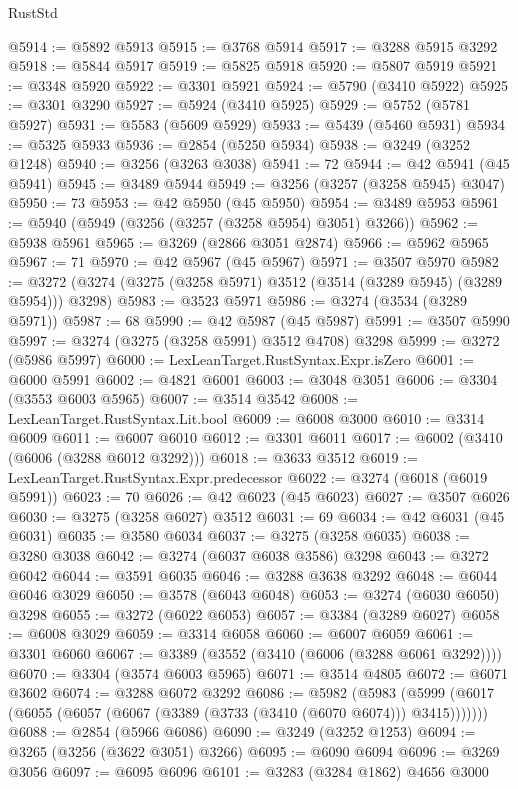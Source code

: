 \begin{lexlean}{RustStd}
\begin{coremodule}
@5914 := @5892 @5913
@5915 := @3768 @5914
@5917 := @3288 @5915 @3292
@5918 := @5844 @5917
@5919 := @5825 @5918
@5920 := @5807 @5919
@5921 := @3348 @5920
@5922 := @3301 @5921
@5924 := @5790 (@3410 @5922)
@5925 := @3301 @3290
@5927 := @5924 (@3410 @5925)
@5929 := @5752 (@5781 @5927)
@5931 := @5583 (@5609 @5929)
@5933 := @5439 (@5460 @5931)
@5934 := @5325 @5933
@5936 := @2854 (@5250 @5934)
@5938 := @3249 (@3252 @1248)
@5940 := @3256 (@3263 @3038)
@5941 := 72
@5944 := @42 @5941 (@45 @5941)
@5945 := @3489 @5944
@5949 := @3256 (@3257 (@3258 @5945) @3047)
@5950 := 73
@5953 := @42 @5950 (@45 @5950)
@5954 := @3489 @5953
@5961 := @5940 (@5949 (@3256 (@3257 (@3258 @5954) @3051) @3266))
@5962 := @5938 @5961
@5965 := @3269 (@2866 @3051 @2874)
@5966 := @5962 @5965
@5967 := 71
@5970 := @42 @5967 (@45 @5967)
@5971 := @3507 @5970
@5982 := @3272 (@3274 (@3275 (@3258 @5971) @3512 (@3514 (@3289 @5945) (@3289 @5954))) @3298)
@5983 := @3523 @5971
@5986 := @3274 (@3534 (@3289 @5971))
@5987 := 68
@5990 := @42 @5987 (@45 @5987)
@5991 := @3507 @5990
@5997 := @3274 (@3275 (@3258 @5991) @3512 @4708) @3298
@5999 := @3272 (@5986 @5997)
@6000 := LexLeanTarget.RustSyntax.Expr.isZero
@6001 := @6000 @5991
@6002 := @4821 @6001
@6003 := @3048 @3051
@6006 := @3304 (@3553 @6003 @5965)
@6007 := @3514 @3542
@6008 := LexLeanTarget.RustSyntax.Lit.bool
@6009 := @6008 @3000
@6010 := @3314 @6009
@6011 := @6007 @6010
@6012 := @3301 @6011
@6017 := @6002 (@3410 (@6006 (@3288 @6012 @3292)))
@6018 := @3633 @3512
@6019 := LexLeanTarget.RustSyntax.Expr.predecessor
@6022 := @3274 (@6018 (@6019 @5991))
@6023 := 70
@6026 := @42 @6023 (@45 @6023)
@6027 := @3507 @6026
@6030 := @3275 (@3258 @6027) @3512
@6031 := 69
@6034 := @42 @6031 (@45 @6031)
@6035 := @3580 @6034
@6037 := @3275 (@3258 @6035)
@6038 := @3280 @3038
@6042 := @3274 (@6037 @6038 @3586) @3298
@6043 := @3272 @6042
@6044 := @3591 @6035
@6046 := @3288 @3638 @3292
@6048 := @6044 @6046 @3029
@6050 := @3578 (@6043 @6048)
@6053 := @3274 (@6030 @6050) @3298
@6055 := @3272 (@6022 @6053)
@6057 := @3384 (@3289 @6027)
@6058 := @6008 @3029
@6059 := @3314 @6058
@6060 := @6007 @6059
@6061 := @3301 @6060
@6067 := @3389 (@3552 (@3410 (@6006 (@3288 @6061 @3292))))
@6070 := @3304 (@3574 @6003 @5965)
@6071 := @3514 @4805
@6072 := @6071 @3602
@6074 := @3288 @6072 @3292
@6086 := @5982
    (@5983 (@5999 (@6017 (@6055 (@6057 (@6067 (@3389 (@3733 (@3410 (@6070 @6074))) @3415)))))))
@6088 := @2854 (@5966 @6086)
@6090 := @3249 (@3252 @1253)
@6094 := @3265 (@3256 (@3622 @3051) @3266)
@6095 := @6090 @6094
@6096 := @3269 @3056
@6097 := @6095 @6096
@6101 := @3283 (@3284 @1862) @4656 @3000

\end{coremodule}
\end{lexlean}
